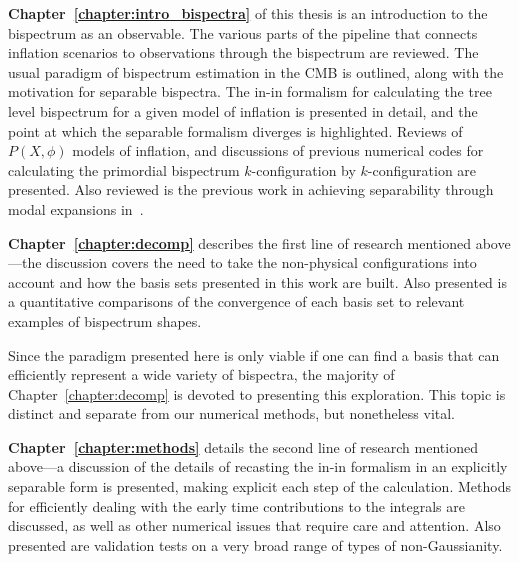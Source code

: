 \bigskip


\textbf{Chapter~\ref{chapter:intro_bispectra}} of this thesis
is an introduction to the bispectrum as an observable.
The various parts of the pipeline that connects inflation scenarios to observations
through the bispectrum are reviewed.
The usual paradigm of bispectrum estimation in the CMB is outlined,
along with the motivation for separable bispectra. The in-in formalism
for calculating the tree level bispectrum for a given model of inflation
is presented in detail, and the point at which the separable formalism diverges is
highlighted.
Reviews of $P(X,\phi)$ models of inflation, and
discussions of previous numerical codes for
calculating the primordial bispectrum $k$-configuration by $k$-configuration
are presented.
Also reviewed is the previous work in achieving separability through modal expansions
in~\cite{Funakoshi}.



\textbf{Chapter~\ref{chapter:decomp}} describes the first line of research mentioned above---the
discussion covers the need to
take the non-physical configurations into account and how the basis sets
presented in this work are built.
Also presented is a quantitative comparisons of the convergence of each basis set to
relevant examples of bispectrum shapes.


Since the paradigm presented here is only viable if one can find a basis
that can efficiently represent a wide variety of bispectra,
the majority of Chapter~\ref{chapter:decomp} is devoted to presenting this exploration.
This topic is distinct and separate from our numerical methods, but nonetheless vital.



\textbf{Chapter~\ref{chapter:methods}} details the second line of research mentioned above---a
discussion of the details of recasting the in-in formalism in an explicitly separable form is presented,
making explicit each step of the calculation.
Methods for efficiently dealing with the early time contributions to the integrals are discussed,
as well as other numerical issues that require care and attention.
Also presented are validation tests on a very broad range of types of non-Gaussianity.


